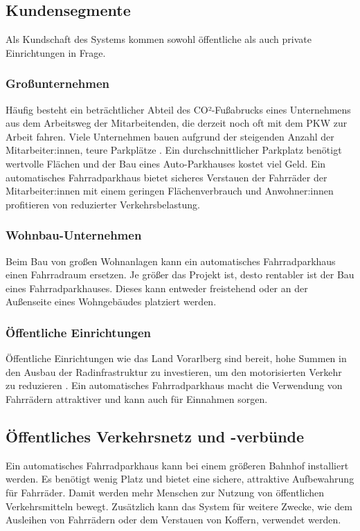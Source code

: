 \subsection{Kundensegmente}
Als Kundschaft des Systems kommen sowohl öffentliche als auch private Einrichtungen in Frage.

\subsubsection{Großunternehmen}
Häufig besteht ein beträchtlicher Abteil des CO²-Fußabrucks eines Unternehmens aus dem Arbeitsweg der Mitarbeitenden, die derzeit noch oft mit dem PKW zur Arbeit fahren. Viele Unternehmen bauen aufgrund der steigenden Anzahl der Mitarbeiter:innen, teure Parkplätze . Ein durchschnittlicher Parkplatz benötigt wertvolle Flächen und der Bau eines Auto-Parkhauses kostet viel Geld. Ein automatisches Fahrradparkhaus bietet sicheres Verstauen der Fahrräder der Mitarbeiter:innen mit einem geringen Flächenverbrauch und Anwohner:innen profitieren von reduzierter Verkehrsbelastung.

\subsubsection{Wohnbau-Unternehmen}
Beim Bau von großen Wohnanlagen kann ein automatisches Fahrradparkhaus einen Fahrradraum ersetzen. Je größer das Projekt ist, desto rentabler ist der Bau eines Fahrradparkhauses. Dieses kann entweder freistehend oder an der Außenseite eines Wohngebäudes platziert werden.

\subsubsection{Öffentliche Einrichtungen}
Öffentliche Einrichtungen wie das Land Vorarlberg sind bereit, hohe Summen in den Ausbau der Radinfrastruktur zu investieren, um den motorisierten Verkehr zu reduzieren . Ein automatisches Fahrradparkhaus macht die Verwendung von Fahrrädern attraktiver und kann auch für Einnahmen sorgen.

\subsection{Öffentliches Verkehrsnetz und -verbünde}
Ein automatisches Fahrradparkhaus kann bei einem größeren Bahnhof installiert werden. Es benötigt wenig Platz und bietet eine sichere, attraktive Aufbewahrung für Fahrräder. Damit werden mehr Menschen zur Nutzung von öffentlichen Verkehrsmitteln bewegt. Zusätzlich kann das System für weitere Zwecke, wie dem Ausleihen von Fahrrädern oder dem Verstauen von Koffern, verwendet werden.

